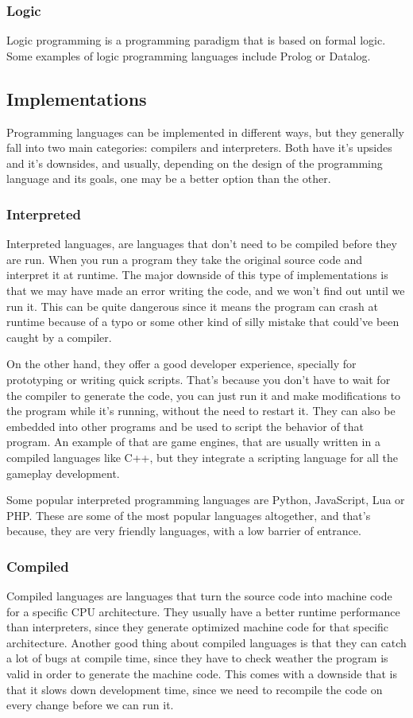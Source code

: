 ﻿\documentclass[10pt,a4paper,twocolumn,twoside]{article}
\begin{document}
\subsubsection{Logic}
Logic programming is a programming paradigm that is based on formal logic. 
Some examples of logic programming languages include Prolog or Datalog.

\subsection{Implementations}
Programming languages can be implemented in different ways, but they generally
fall into two main categories: compilers and interpreters. Both have it's
upsides and it's downsides, and usually, depending on the design of the
programming language and its goals, one may be a better option than the other.

\subsubsection{Interpreted}
Interpreted languages, are languages that don't need to be compiled before they
are run. When you run a program they take the original source code and interpret
it at runtime. The major downside of this type of implementations is that we may
have made an error writing the code, and we won't find out until we run it. This
can be quite dangerous since it means the program can crash at runtime because
of a typo or some other kind of silly mistake that could've been caught by a
compiler.

On the other hand, they offer a good developer experience, specially for
prototyping or writing quick scripts. That's because you don't have to wait for
the compiler to generate the code, you can just run it and make modifications to
the program while it's running, without the need to restart it. They can also be
embedded into other programs and be used to script the behavior of that program.
An example of that are game engines, that are usually written in a compiled
languages like C++, but they integrate a scripting language for all the gameplay
development.

Some popular interpreted programming languages are Python, JavaScript, Lua or
PHP. These are some of the most popular languages altogether, and that's
because, they are very friendly languages, with a low barrier of entrance.

\subsubsection{Compiled}
Compiled languages are languages that turn the source code into machine code for
a specific CPU architecture. They usually have a better runtime performance than
interpreters, since they generate optimized machine code for that specific
architecture. Another good thing about compiled languages is that they can catch
a lot of bugs at compile time, since they have to check weather the program is
valid in order to generate the machine code. This comes with a downside that is
that it slows down development time, since we need to recompile the code on
every change before we can run it.
\end{document}
